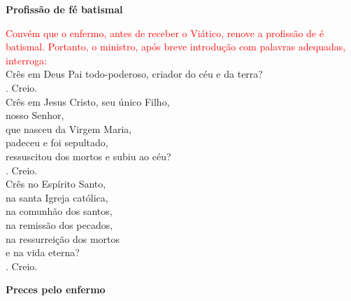 \documentclass{book}
\begin{document}
\begin{center}
    \textbf{Profissão de fé batismal}
\end{center}
\begin{flushleft}
    \textcolor{red}{Convém que o enfermo, antes de receber o Viático, renove a profissão de é batismal. Portanto, o ministro, após breve introdução com palavras adequadas, interroga:}
    \vspace{.1cm} \\
    Crês em Deus Pai todo-poderoso, criador do céu e da terra?
    \vspace{.1cm} \\
    {\color{red} \Rbar.} Creio.
    \vspace{.1cm} \\
    Crês em Jesus Cristo, seu único Filho, \\
    nosso Senhor, \\
    que nasceu da Virgem Maria, \\
    padeceu e foi sepultado, \\
    ressuscitou dos mortos e subiu ao céu?
    \vspace{.1cm} \\
    {\color{red} \Rbar.} Creio.
    \vspace{.1cm} \\
    Crês no Espírito Santo, \\
    na santa Igreja católica, \\
    na comunhão dos santos, \\
    na remissão dos pecados, \\
    na ressurreição dos mortos \\
    e na vida eterna?
    \vspace{.1cm} \\
    {\color{red} \Rbar.} Creio.
    \vspace{.1cm} \\
\end{flushleft}
\begin{center}
    \textbf{Preces pelo enfermo}
\end{center}
\end{document}
